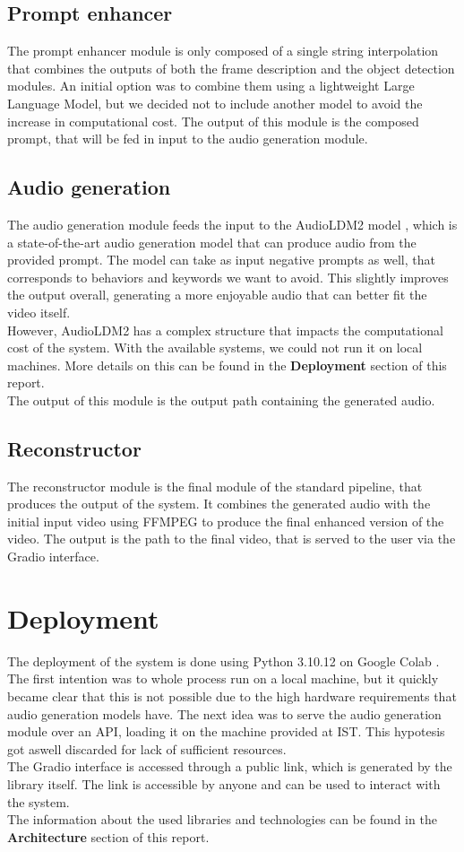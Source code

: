 \documentclass[conference]{IEEEtran}
\begin{document}
\subsection{Prompt enhancer}
The prompt enhancer module is only composed of a single string interpolation that combines the outputs of both the frame description and the object detection modules. An initial option was to combine them using a lightweight Large Language Model, but we decided not to include another model to avoid the increase in computational cost.
The output of this module is the composed prompt, that will be fed in input to the audio generation module. 

\subsection{Audio generation}
The audio generation module feeds the input to the AudioLDM2 model \cite{audioldm2}, which is a state-of-the-art audio generation model that can produce audio from the provided prompt. The model can take as input negative prompts as well, that corresponds to behaviors and keywords we want to avoid. 
This slightly improves the output overall, generating a more enjoyable audio that can better fit the video itself.\\
However, AudioLDM2 has a complex structure that impacts the computational cost of the system. With the available systems, we could not run it on local machines. More details on this can be found in the \textbf{Deployment} section of this report.\\
The output of this module is the output path containing the generated audio.

\subsection{Reconstructor}
The reconstructor module is the final module of the standard pipeline, that produces the output of the system.
It combines the generated audio with the initial input video using FFMPEG \cite{ffmpeg} to produce the final enhanced version of the video. 
The output is the path to the final video, that is served to the user via the Gradio interface.

\section{Deployment}
The deployment of the system is done using Python 3.10.12 on Google Colab \cite{Colab}. The first intention was to whole process run on a local machine, but it quickly became clear that this is not possible due to the high hardware requirements that audio generation models have.
The next idea was to serve the audio generation module over an API, loading it on the machine provided at IST. This hypotesis got aswell discarded for lack of sufficient resources.
\\The Gradio interface is accessed through a public link, which is generated by the library itself. The link is accessible by anyone and can be used to interact with the system.
\\The information about the used libraries and technologies can be found in the \textbf{Architecture} section of this report.
\end{document}
